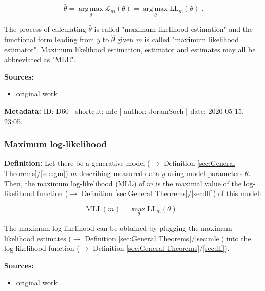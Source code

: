 \documentclass[a4paper,12pt,twoside]{book}
\begin{document}
\begin{equation} \label{eq:mle-mle}
\hat{\theta} = \operatorname*{arg\,max}_\theta \mathcal{L}_m(\theta) = \operatorname*{arg\,max}_\theta \mathrm{LL}_m(\theta) \; .
\end{equation}

The process of calculating $\hat{\theta}$ is called "maximum likelihood estimation" and the functional form leading from $y$ to $\hat{\theta}$ given $m$ is called "maximum likelihood estimator". Maximum likelihood estimation, estimator and estimates may all be abbreviated as "MLE".


\vspace{1em}
\textbf{Sources:}
\begin{itemize}
\item original work\end{itemize}


\vspace{1em}
\textbf{Metadata:} ID: D60 | shortcut: mle | author: JoramSoch | date: 2020-05-15, 23:05.
\vspace{1em}



\subsubsection[\textit{Maximum log-likelihood}]{Maximum log-likelihood} \label{sec:mll}
\setcounter{equation}{0}

\textbf{Definition:} Let there be a generative model ($\rightarrow$ Definition \ref{sec:General Theorems}/\ref{sec:gm}) $m$ describing measured data $y$ using model parameters $\theta$. Then, the maximum log-likelihood (MLL) of $m$ is the maximal value of the log-likelihood function ($\rightarrow$ Definition \ref{sec:General Theorems}/\ref{sec:llf}) of this model:

\begin{equation} \label{eq:mll-mll}
\mathrm{MLL}(m) = \operatorname*{max}_\theta \mathrm{LL}_m(\theta) \; .
\end{equation}

The maximum log-likelihood can be obtained by plugging the maximum likelihood estimates ($\rightarrow$ Definition \ref{sec:General Theorems}/\ref{sec:mle}) into the log-likelihood function ($\rightarrow$ Definition \ref{sec:General Theorems}/\ref{sec:llf}).


\vspace{1em}
\textbf{Sources:}
\begin{itemize}
\item original work\end{itemize}
\end{document}
